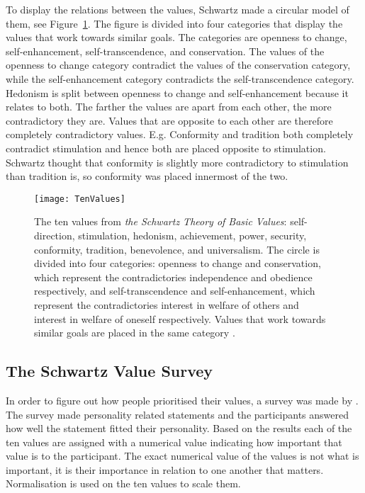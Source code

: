 To display the relations between the values, Schwartz made a circular model of them, see Figure~\ref{fig:TenValuesSchwartz}. The figure is divided into four categories that display the values that work towards similar goals. The categories are openness to change, self-enhancement, self-transcendence, and conservation. The values of the openness to change category contradict the values of the conservation category, while the self-enhancement category contradicts the self-transcendence category. Hedonism is split between openness to change and self-enhancement because it relates to both. The farther the values are apart from each other, the more contradictory they are. Values that are opposite to each other are therefore completely contradictory values. E.g. Conformity and tradition both completely contradict stimulation and hence both are placed opposite to stimulation. Schwartz thought that conformity is slightly more contradictory to stimulation than tradition is, so conformity was placed innermost of the two.

\begin{figure}
    \centering
    \texttt{[image: TenValues]}   
    \caption[The ten values from \textit{the Schwartz Theory of Basic Values}.]{The ten values from \textit{the Schwartz Theory of Basic Values}: self-direction, stimulation, hedonism, achievement, power, security, conformity, tradition, benevolence, and universalism. The circle is divided into four categories: openness to change and conservation, which represent the contradictories independence and obedience respectively, and self-transcendence and self-enhancement, which represent the contradictories interest in welfare of others and interest in welfare of oneself respectively. Values that work towards similar goals are placed in the same category \citep{schwartz2012overview}.}
    \label{fig:TenValuesSchwartz}
\end{figure}

\subsection{The Schwartz Value Survey}
In order to figure out how people prioritised their values, a survey was made by \citet{schwartz2012overview}. The survey made personality related statements and the participants answered how well the statement fitted their personality. Based on the results each of the ten values are assigned with a numerical value indicating how important that value is to the participant. The exact numerical value of the values is not what is important, it is their importance in relation to one another that matters. Normalisation is used on the ten values to scale them. 

